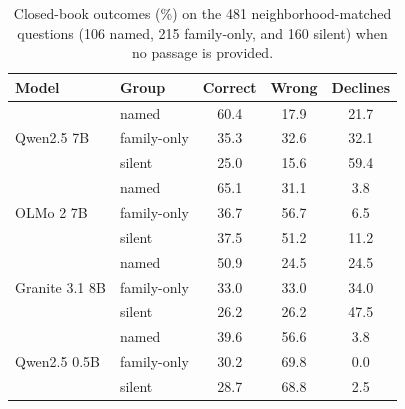 \begin{table}[h]
\centering
\small
\setlength{\tabcolsep}{2.8pt}
\begin{tabular}{llccc}
\toprule
Model & Group & Correct & Wrong & Declines \\
\midrule
\multirow{3}{*}{Qwen2.5 7B} & named & 60.4 & 17.9 & 21.7 \\
 & family-only & 35.3 & 32.6 & 32.1 \\
 & silent & 25.0 & 15.6 & 59.4 \\
\midrule
\multirow{3}{*}{OLMo 2 7B} & named & 65.1 & 31.1 & 3.8 \\
 & family-only & 36.7 & 56.7 & 6.5 \\
 & silent & 37.5 & 51.2 & 11.2 \\
\midrule
\multirow{3}{*}{Granite 3.1 8B} & named & 50.9 & 24.5 & 24.5 \\
 & family-only & 33.0 & 33.0 & 34.0 \\
 & silent & 26.2 & 26.2 & 47.5 \\
\midrule
\multirow{3}{*}{Qwen2.5 0.5B} & named & 39.6 & 56.6 & 3.8 \\
 & family-only & 30.2 & 69.8 & 0.0 \\
 & silent & 28.7 & 68.8 & 2.5 \\
\bottomrule
\end{tabular}
\caption{Closed-book outcomes (\%) on the 481 neighborhood-matched questions (106 named, 215 family-only, and 160 silent) when no passage is provided.}
\label{tab:closed_full}
\end{table}